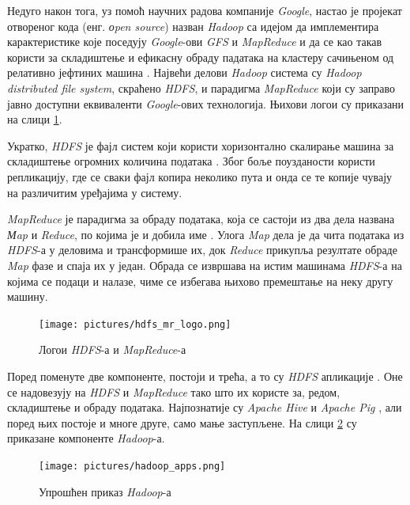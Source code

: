 \documentclass[12pt,oneside]{memoir}
\begin{document}
Недуго након тога, уз помоћ научних радова компаније \textit{Google}, настао је пројекат отвореног кода (енг. \textit{оpen source}) назван \textit{Hadoop} са идејом да имплементира карактеристике које поседују \textit{Google}-ови \textit{GFS} и \textit{MapReduce} и да се као такав користи за складиштење и ефикасну обраду падатака на кластеру сачињеном од релативно јефтиних машина \cite{hadoop_beginner}. Највећи делови \textit{Hadoop} система су \textit{Hadoop distributed file system}, скраћено \textit{HDFS}, и парадигма \textit{MapReduce} који су заправо јавно доступни еквиваленти \textit{Google}-ових технологија. Њихови логои су приказани на слици \ref{fig:hdfs_mr_logo}.

Укратко, \textit{HDFS} је фајл систем који користи хоризонтално скалирање машина за складиштење огромних количина података \cite{hadoop_beginner}. Због боље поузданости користи репликацију, где се сваки фајл копира неколико пута и онда се те копије чувају на различитим уређајима у систему.

\textit{MapReduce} је парадигма за обраду података, која се састоји из два дела названа \textit{Мap} и \textit{Reduce}, по којима је и добила име \cite{hadoop_beginner}. Улога \textit{Map} дела је да чита података из \textit{HDFS}-а у деловима и трансформише их, док \textit{Reduce} прикупља резултате обраде \textit{Map} фазе и спаја их у један. Обрада се извршава на истим машинама \textit{HDFS}-а на којима се подаци и налазе, чиме се избегава њихово премештање на неку другу машину.

\begin{figure}[!ht]
  \centering
  \texttt{[image: pictures/hdfs\_mr\_logo.png]}
  \caption{Логои \textit{HDFS}-а и \textit{MapReduce}-а}
  \label{fig:hdfs_mr_logo}
\end{figure}

Поред поменуте две компоненте, постоји и трећа, а то су \textit{HDFS} апликације \cite{hadoop_learning}. Оне се надовезују на \textit{HDFS} и \textit{MapReduce} тако што их користе за, редом, складиштење и обраду података. Најпознатије су \textit{Apache Hive} \cite{apache_hive} и \textit{Apache Pig} \cite{apache_pig}, али поред њих постоје и многе друге, само мање заступљене. На слици \ref{fig:hadoop_aplikacije} су приказане компоненте \textit{Hadoop}-а.

\begin{figure}[!ht]
  \centering
  \texttt{[image: pictures/hadoop\_apps.png]}
  \caption{Упрошћен приказ \textit{Hadoop}-а}
  \label{fig:hadoop_aplikacije}
\end{figure}
\end{document}
